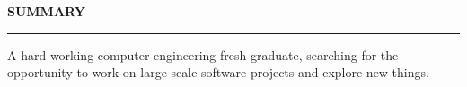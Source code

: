 \noindent\textcolor{themecolor}{\textbf{SUMMARY}}

\vspace{2mm}
\hrule
\vspace{3mm}
\noindent A hard-working computer engineering fresh graduate, searching for the opportunity to work on large scale software projects
and explore new things. 

